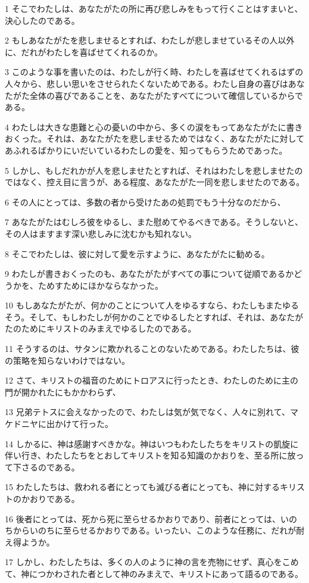 \par 1 そこでわたしは、あなたがたの所に再び悲しみをもって行くことはすまいと、決心したのである。
\par 2 もしあなたがたを悲しませるとすれば、わたしが悲しませているその人以外に、だれがわたしを喜ばせてくれるのか。
\par 3 このような事を書いたのは、わたしが行く時、わたしを喜ばせてくれるはずの人々から、悲しい思いをさせられたくないためである。わたし自身の喜びはあなたがた全体の喜びであることを、あなたがたすべてについて確信しているからである。
\par 4 わたしは大きな患難と心の憂いの中から、多くの涙をもってあなたがたに書きおくった。それは、あなたがたを悲しませるためではなく、あなたがたに対してあふれるばかりにいだいているわたしの愛を、知ってもらうためであった。
\par 5 しかし、もしだれかが人を悲しませたとすれば、それはわたしを悲しませたのではなく、控え目に言うが、ある程度、あなたがた一同を悲しませたのである。
\par 6 その人にとっては、多数の者から受けたあの処罰でもう十分なのだから、
\par 7 あなたがたはむしろ彼をゆるし、また慰めてやるべきである。そうしないと、その人はますます深い悲しみに沈むかも知れない。
\par 8 そこでわたしは、彼に対して愛を示すように、あなたがたに勧める。
\par 9 わたしが書きおくったのも、あなたがたがすべての事について従順であるかどうかを、ためすためにほかならなかった。
\par 10 もしあなたがたが、何かのことについて人をゆるすなら、わたしもまたゆるそう。そして、もしわたしが何かのことでゆるしたとすれば、それは、あなたがたのためにキリストのみまえでゆるしたのである。
\par 11 そうするのは、サタンに欺かれることのないためである。わたしたちは、彼の策略を知らないわけではない。
\par 12 さて、キリストの福音のためにトロアスに行ったとき、わたしのために主の門が開かれたにもかかわらず、
\par 13 兄弟テトスに会えなかったので、わたしは気が気でなく、人々に別れて、マケドニヤに出かけて行った。
\par 14 しかるに、神は感謝すべきかな。神はいつもわたしたちをキリストの凱旋に伴い行き、わたしたちをとおしてキリストを知る知識のかおりを、至る所に放って下さるのである。
\par 15 わたしたちは、救われる者にとっても滅びる者にとっても、神に対するキリストのかおりである。
\par 16 後者にとっては、死から死に至らせるかおりであり、前者にとっては、いのちからいのちに至らせるかおりである。いったい、このような任務に、だれが耐え得ようか。
\par 17 しかし、わたしたちは、多くの人のように神の言を売物にせず、真心をこめて、神につかわされた者として神のみまえで、キリストにあって語るのである。

